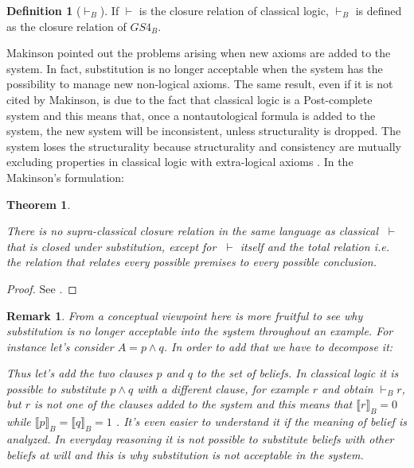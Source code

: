 \documentclass[a4paper, 12pt, oneside]{article}
\theoremstyle{plain}
\newtheorem{theorem}{Theorem}[section]
\newtheorem{remark}{Remark}[section]
\theoremstyle{definition}
\newtheorem{definition}{Definition}[section]
\begin{document}
\begin{definition}[$\vdash_B$]
	
	If $\vdash$ is the closure relation of classical logic, $\vdash_B$ is defined as the closure relation of $GS4_B$.
	
\end{definition}

Makinson \cite{mak:bridges} pointed out the problems arising when new axioms are added to the system. In fact, substitution is no longer acceptable when the system has the possibility to manage new non-logical axioms. The same result, even if it is not cited by Makinson, is due to the fact that classical logic is a Post-complete system and this means that, once a nontautological formula is added to the system, the new system will be inconsistent, unless structurality is dropped.  The system loses the structurality because structurality and consistency are mutually excluding properties in classical logic with extra-logical axioms \cite{piazzapulcini_uniqueness}. In the Makinson's formulation:

	\begin{theorem}
	\label{th:subMak}
	
	There is no supra-classical closure relation in the same language as classical $\; \vdash$ that is closed under substitution, except for $\; \vdash$ itself and the total relation i.e. the relation that relates every possible premises to every possible conclusion.
	
\end{theorem}
\noindent 

\begin{proof}
See \cite{mak:bridges}.
\end{proof}

\begin{remark}

From a conceptual viewpoint here is more fruitful to see why substitution is no longer acceptable into the system throughout an example. For instance let's consider $A = p\wedge q$. In order to add that we have to decompose it: 

	\begin{prooftree}
	\RightLabel{$(\wedge)$}
\end{prooftree}
\noindent

Thus let's add the two clauses $p$ and $q$ to the set of beliefs. In classical logic it is possible to substitute  $p\wedge q$ with a different clause, for example $r$ and obtain $\vdash_B r$, but $r$ is not one of the clauses added to the system and this means that $\llbracket r \rrbracket_B = 0 $ while $\llbracket p \rrbracket_B = \llbracket q \rrbracket_B = 1$ . It's even easier to understand it if the meaning of belief is analyzed. In everyday reasoning it is not possible to substitute beliefs with other beliefs at will and this is why substitution is not acceptable in the system.

\end{remark}
\end{document}
